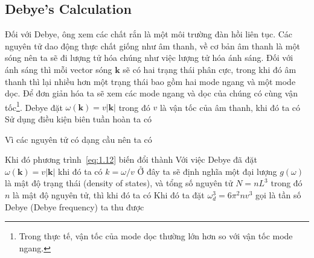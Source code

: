 \subsection{Debye's Calculation}
Đối với Debye, ông xem các chất rắn là một môi trường đàn hồi liên tục. Các nguyên tử dao động thực chất giống như âm thanh, về cơ bản âm thanh là một sóng nên ta sẽ đi lượng tử hóa chúng như việc lượng tử hóa ánh sáng. Đối với ánh sáng thì mỗi vector sóng $\mathbf{k}$ sẽ có hai trạng thái
phân cực, trong khi đó âm thanh thì lại nhiều hơn một trạng thái bao gồm hai mode ngang và một mode dọc. Để đơn giản hóa ta sẽ xem các mode ngang và dọc của chúng có cùng vận tốc\footnote{Trong thực tế, vận tốc của mode dọc thường lớn hơn so với vận tốc mode ngang.}. 
Debye đặt $\omega(\mathbf{k})=v|\mathbf{k}|$ trong đó $v$ là vận tốc của âm thanh, khi đó ta có
Sử dụng điều kiện biên tuần hoàn ta có
\begin{more}
    Vì các nguyên tử có dạng cầu nên ta có
\end{more}
\noindent Khi đó phương trình~\eqref{eq:1.12} biến đổi thành
Với việc Debye đã đặt $\omega(\mathbf{k})=v|\mathbf{k}|$ khi đó ta có $k=\omega/v$
Ở đây ta sẽ định nghĩa một đại lượng $g(\omega)$ là mật độ trạng thái (density of states), và tổng số nguyên tử $N=nL^3$ trong đó $n$ là mật độ nguyên tử, thì khi đó ta có
Khi đó ta đặt $\omega_d^3=6\pi^2 n v^3$ gọi là tần số Debye (Debye frequency) ta thu được
